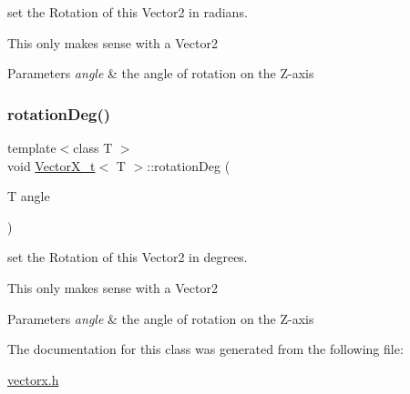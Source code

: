 set the Rotation of this Vector2 in radians. 

This only makes sense with a Vector2


\begin{DoxyParams}{Parameters}
{\em angle} & the angle of rotation on the Z-\/axis \\
\hline
\end{DoxyParams}
\mbox{\label{class_vector_x__t_a9f02a5c0c808aa2270e443031ba1e9e0}} 
\subsubsection{\texorpdfstring{rotation\+Deg()}{rotationDeg()}}
{\footnotesize\ttfamily template$<$class T $>$ \\
void \hyperlink{class_vector_x__t}{Vector\+X\+\_\+t}$<$ T $>$\+::rotation\+Deg (\begin{DoxyParamCaption}\item[{T}]{angle }\end{DoxyParamCaption})}



set the Rotation of this Vector2 in degrees. 

This only makes sense with a Vector2


\begin{DoxyParams}{Parameters}
{\em angle} & the angle of rotation on the Z-\/axis \\
\hline
\end{DoxyParams}


The documentation for this class was generated from the following file\+:\begin{DoxyCompactItemize}
\item 
\hyperlink{vectorx_8h}{vectorx.\+h}\end{DoxyCompactItemize}
